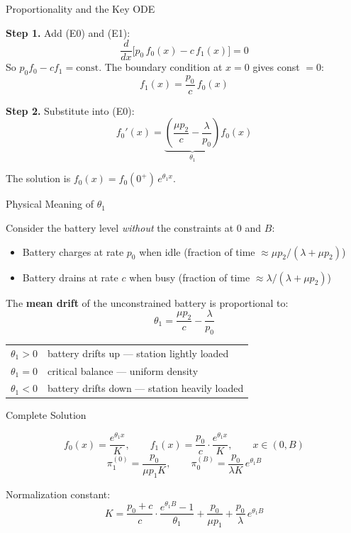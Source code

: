 \documentclass[aspectratio=169]{beamer}
\begin{document}
\begin{frame}{Proportionality and the Key ODE}

  \textbf{Step 1.} Add (E0) and (E1):
  \[
    \frac{d}{dx}\bigl[p_0\,f_0(x) - c\,f_1(x)\bigr] = 0
  \]
  So $p_0 f_0 - c f_1 = \text{const}$. The boundary condition at $x=0$ gives const $= 0$:
  \[
    \boxed{f_1(x) = \frac{p_0}{c}\,f_0(x)}
  \]

  \bigskip
  \textbf{Step 2.} Substitute into (E0):
  \[
    f_0'(x) = \underbrace{\left(\frac{\mu p_2}{c} - \frac{\lambda}{p_0}\right)}_{\displaystyle\theta_1} f_0(x)
  \]

  The solution is $f_0(x) = f_0(0^+)\,e^{\theta_1 x}$.

\end{frame}

\begin{frame}{Physical Meaning of $\theta_1$}

  Consider the battery level \emph{without} the constraints at $0$ and $B$:

  \medskip
  \begin{itemize}
    \setlength\itemsep{0.6em}
    \item Battery charges at rate $p_0$ when idle (fraction of time $\approx \mu p_2/(\lambda+\mu p_2)$)
    \item Battery drains at rate $c$ when busy (fraction of time $\approx \lambda/(\lambda+\mu p_2)$)
  \end{itemize}

  \medskip
  The \textbf{mean drift} of the unconstrained battery is proportional to:
  \[
    \theta_1 = \frac{\mu p_2}{c} - \frac{\lambda}{p_0}
  \]

  \bigskip
  \begin{center}
  \renewcommand{\arraystretch}{1.3}
  \begin{tabular}{cl}
    \toprule
    $\theta_1 > 0$ & battery drifts up — station lightly loaded \\
    $\theta_1 = 0$ & critical balance — uniform density \\
    $\theta_1 < 0$ & battery drifts down — station heavily loaded \\
    \bottomrule
  \end{tabular}
  \end{center}

\end{frame}

\begin{frame}{Complete Solution}

  \[
    f_0(x) = \frac{e^{\theta_1 x}}{K}, \qquad
    f_1(x) = \frac{p_0}{c}\cdot\frac{e^{\theta_1 x}}{K}, \qquad x\in(0,B)
  \]
  \[
    \pi_1^{(0)} = \frac{p_0}{\mu p_1 K}, \qquad
    \pi_0^{(B)} = \frac{p_0}{\lambda K}\,e^{\theta_1 B}
  \]

  \medskip
  Normalization constant:
  \[
    K = \frac{p_0+c}{c}\cdot\frac{e^{\theta_1 B}-1}{\theta_1}
      + \frac{p_0}{\mu p_1} + \frac{p_0}{\lambda}\,e^{\theta_1 B}
  \]

\end{frame}
\end{document}
